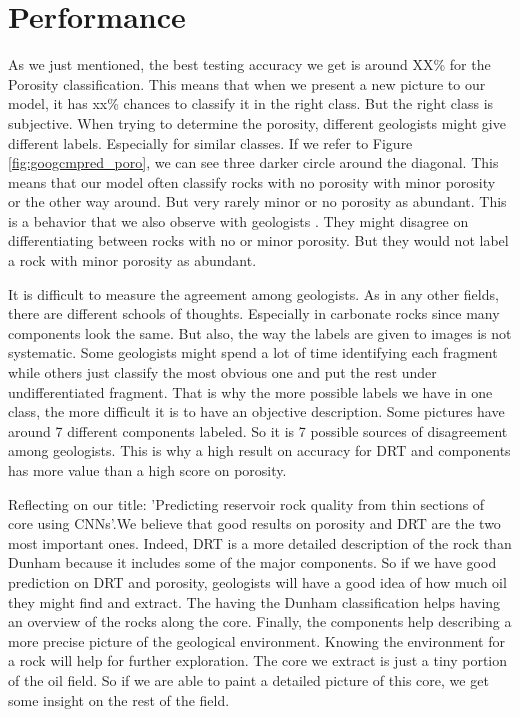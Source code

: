 \section{Performance}

As we just mentioned, the best testing accuracy we get is around XX\% for the Porosity classification. This means that when we present a new picture to our model, it has xx\% chances to classify it in the right class. But the right class is subjective. When trying to determine the porosity, different geologists might give different labels. Especially for similar classes. If we refer to Figure \ref{fig:googcmpred_poro}, we can see three darker circle around the diagonal. This means that our model often classify rocks with no porosity with minor porosity or the other way around. But very rarely minor or no porosity as abundant. This is a behavior that we also observe with geologists \cite{thesis_imperial}.
They might disagree on differentiating between rocks with no or minor porosity. But they would not label a rock with minor porosity as abundant. 

It is difficult to measure the agreement among geologists. As in any other fields, there are different schools of thoughts. Especially in carbonate rocks since many components look the same. But also, the way the labels are given to images is not systematic. Some geologists might spend a lot of time identifying each fragment while others just classify the most obvious one and put the rest under undifferentiated fragment. That is why the more possible labels we have in one class, the more difficult it is to have an objective description. Some pictures have around 7 different components labeled. So it is 7 possible sources of disagreement among geologists. This is why a high result on accuracy for DRT and components has more value than a high score on porosity. 

Reflecting on our title: 'Predicting reservoir rock quality from thin sections of core using CNNs'.We believe that good results on porosity and DRT are the two most important ones. Indeed, DRT is a more detailed description of the rock than Dunham because it includes some of the major components. So if we have good prediction on DRT and porosity, geologists will have a good idea of how much oil they might find and extract. The having the Dunham classification helps having an overview of the rocks along the core. Finally, the components help describing a more precise picture of the geological environment. Knowing the environment for a rock will help for further exploration. The core we extract is just a tiny portion of the oil field. So if we are able to paint a detailed picture of this core, we get some insight on the rest of the field. 